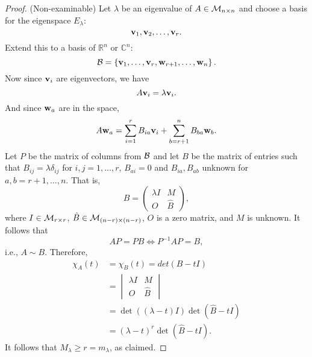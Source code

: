 \documentclass[10pt]{article}
\def\ge{\geqslant}
\begin{document}
    \begin{proof}(Non-examinable) Let $\lambda$ be an eigenvalue of $A\in {\mathcal{M}}_{n\times n}$ and choose a basis for the eigenspace $ E_\lambda $:
        \[
            {\bf v}_1,{\bf v}_2,\dots,{\bf v}_r.
        \]
        Extend this to a basis of $ \mathbb{R}^{n} $ or $ \mathbb{C}^{n} $:
        \[
            {\mathcal{B}}=\left\{ {\bf v}_1,\dots,{\bf v}_r,{\bf w}_{r+1},\dots, {\bf w}_{n} \right\}.
        \]
        Now since ${\bf v}_i$ are eigenvectors, we have 
        \[
            A {\bf v}_i = \lambda {\bf v}_i.
        \]
        And since ${\bf w}_a$ are in the space,
        \[
            A {\bf w}_a = \sum_{i=1}^{r} B_{ia} {\bf v}_i + \sum_{b=r+1}^{n} B_{ba} {\bf w}_{b}.
        \]
        Let $P$ be the matrix of columns from $ {\mathcal{B}} $ and let $B$ be the matrix of entries such that $B_{ij}=\lambda \delta_{ij}$ for $i,j=1,\dots,r$, $B_{ai}=0$ and $ B_{ia},B_{ab} $ unknown for $ a,b=r+1,\dots,n $. That is,
        \[
            B = \begin{pmatrix}
                \lambda I & M\\
                O & \hat{B}
            \end{pmatrix},
        \]
        where $I\in {\mathcal{M}}_{r\times r}$, $ \hat{B}\in {\mathcal{M}}_{(n-r)\times (n-r)} $, $O$ is a zero matrix, and $M$ is unknown. It follows that 
        \[
            AP=PB \Longleftrightarrow P^{-1}AP=B,
        \] 
        i.e., $A\sim B$. Therefore,
        \begin{align*}
            \chi_A(t)&=\chi_B(t)=det(B-tI)\\
            &= \begin{vmatrix}
                \lambda I & M\\
                O & \hat{B}
            \end{vmatrix}\\
            &= \det ((\lambda-t)I)\det (\hat{B}-tI)\\
            &= (\lambda-t)^{r}\det (\hat{B}-tI).
        \end{align*}
        It follows that $ M_\lambda\ge r = m_\lambda $, as claimed.
    \end{proof}
\end{document}
